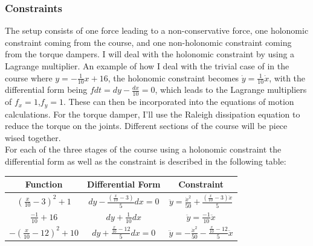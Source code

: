 \documentclass{article}
\begin{document}
\subsubsection{Constraints}
The setup consists of one force leading to a non-conservative force, one holonomic constraint coming from the course, and one non-holonomic constraint coming from the torque dampers. I will deal with the holonomic constraint by using a Lagrange multiplier.  An example of how I deal with the trivial case of in the course where $y=-\frac{1}{10}x+16$, the holonomic constraint becomes $\dot{y}=\frac{1}{10}\dot{x}$, with the differential form being $fdt=dy-\frac{dx}{10}=0$, which leads to the Lagrange multipliers of $f_x=1$,$f_y=1$. These can then be incorporated into the equations of motion calculations.  For the torque damper, I’ll use the Raleigh dissipation equation to reduce the torque on the joints. Different sections of the course will be piece wised together. \\
For each of the three stages of the course using a holonomic constraint the differential form as well as the constraint is described in the following table:
\begin{center}
\begin{tabular}{c|c|c}
	Function&Differential Form&Constraint\\
	\hline
	$(\frac{x}{10}-3)^2+1$&$dy-\frac{\left(\frac{x}{10} - 3\right)}{5} dx=0$&$\ddot{y}=\frac{\dot{x}^2}{50} + \frac{\left(\frac{x}{10} - 3\right) \ddot{x}}{5}$\\
	$\frac{-1}{10}+16$&$dy+\frac{1}{10}dx$&$\ddot{y}=\frac{-1}{10}\ddot{x}$\\
	$-(\frac{x}{10}-12)^2+10$&$dy+\frac{\frac{x}{10}-12}{5}dx=0$&$\ddot{y}=-\frac{\dot{x}^2}{50}-\frac{\frac{x}{10}-12}{5}\ddot{x}$\\
\end{tabular}
\end{center}
\end{document}
